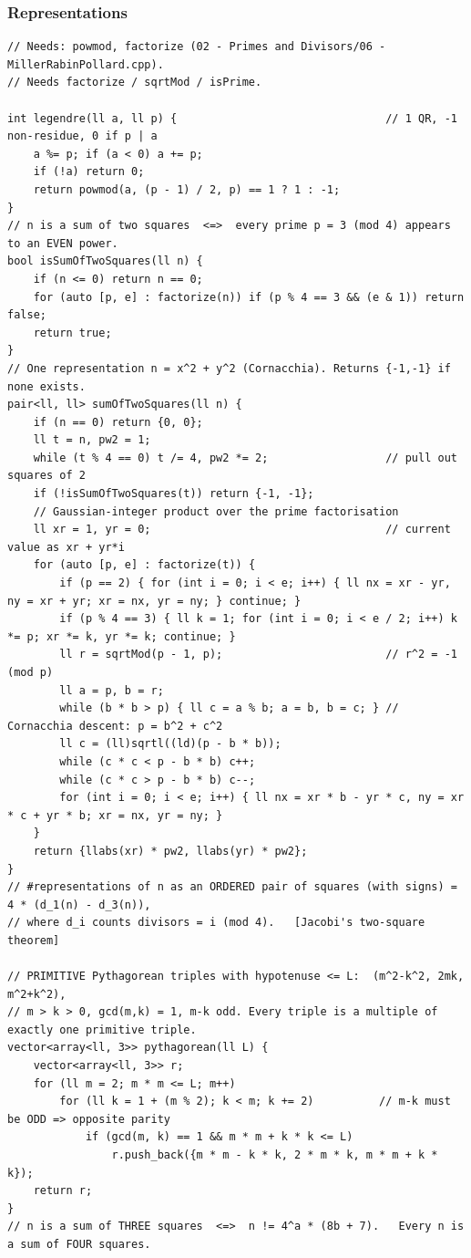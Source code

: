 \documentclass[9pt,a4paper,twocolumn]{extarticle}
\begin{document}
\filbreak
\subsubsection{Representations}
\nopagebreak
\begin{lstlisting}
// Needs: powmod, factorize (02 - Primes and Divisors/06 - MillerRabinPollard.cpp).
// Needs factorize / sqrtMod / isPrime.

int legendre(ll a, ll p) {                                // 1 QR, -1 non-residue, 0 if p | a
    a %= p; if (a < 0) a += p;
    if (!a) return 0;
    return powmod(a, (p - 1) / 2, p) == 1 ? 1 : -1;
}
// n is a sum of two squares  <=>  every prime p = 3 (mod 4) appears to an EVEN power.
bool isSumOfTwoSquares(ll n) {
    if (n <= 0) return n == 0;
    for (auto [p, e] : factorize(n)) if (p % 4 == 3 && (e & 1)) return false;
    return true;
}
// One representation n = x^2 + y^2 (Cornacchia). Returns {-1,-1} if none exists.
pair<ll, ll> sumOfTwoSquares(ll n) {
    if (n == 0) return {0, 0};
    ll t = n, pw2 = 1;
    while (t % 4 == 0) t /= 4, pw2 *= 2;                  // pull out squares of 2
    if (!isSumOfTwoSquares(t)) return {-1, -1};
    // Gaussian-integer product over the prime factorisation
    ll xr = 1, yr = 0;                                    // current value as xr + yr*i
    for (auto [p, e] : factorize(t)) {
        if (p == 2) { for (int i = 0; i < e; i++) { ll nx = xr - yr, ny = xr + yr; xr = nx, yr = ny; } continue; }
        if (p % 4 == 3) { ll k = 1; for (int i = 0; i < e / 2; i++) k *= p; xr *= k, yr *= k; continue; }
        ll r = sqrtMod(p - 1, p);                         // r^2 = -1 (mod p)
        ll a = p, b = r;
        while (b * b > p) { ll c = a % b; a = b, b = c; } // Cornacchia descent: p = b^2 + c^2
        ll c = (ll)sqrtl((ld)(p - b * b));
        while (c * c < p - b * b) c++;
        while (c * c > p - b * b) c--;
        for (int i = 0; i < e; i++) { ll nx = xr * b - yr * c, ny = xr * c + yr * b; xr = nx, yr = ny; }
    }
    return {llabs(xr) * pw2, llabs(yr) * pw2};
}
// #representations of n as an ORDERED pair of squares (with signs) = 4 * (d_1(n) - d_3(n)),
// where d_i counts divisors = i (mod 4).   [Jacobi's two-square theorem]

// PRIMITIVE Pythagorean triples with hypotenuse <= L:  (m^2-k^2, 2mk, m^2+k^2),
// m > k > 0, gcd(m,k) = 1, m-k odd. Every triple is a multiple of exactly one primitive triple.
vector<array<ll, 3>> pythagorean(ll L) {
    vector<array<ll, 3>> r;
    for (ll m = 2; m * m <= L; m++)
        for (ll k = 1 + (m % 2); k < m; k += 2)          // m-k must be ODD => opposite parity
            if (gcd(m, k) == 1 && m * m + k * k <= L)
                r.push_back({m * m - k * k, 2 * m * k, m * m + k * k});
    return r;
}
// n is a sum of THREE squares  <=>  n != 4^a * (8b + 7).   Every n is a sum of FOUR squares.
\end{lstlisting}
\end{document}
